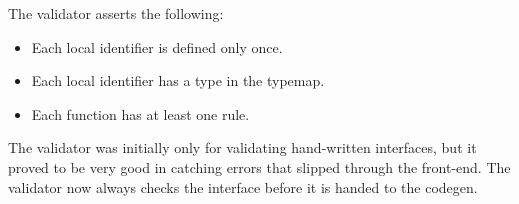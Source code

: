 The validator asserts the following:
\begin{itemize}
\item Each local identifier is defined only once.
\item Each local identifier has a type in the typemap.
\item Each function has at least one rule.
\end{itemize}

The validator was initially only for validating hand-written interfaces,
but it proved to be very good in catching errors that slipped through the front-end.
The validator now always checks the interface before it is handed to the codegen.

